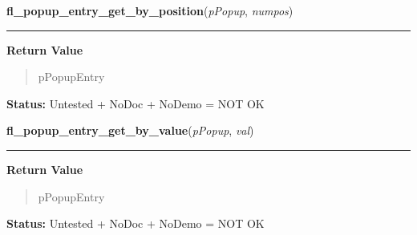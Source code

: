     \label{xformslib:flpopup:fl_popup_entry_get_by_position}

    \vspace{0.5ex}

\hspace{.8\funcindent}\begin{boxedminipage}{\funcwidth}

    \raggedright \textbf{fl\_popup\_entry\_get\_by\_position}(\textit{pPopup}, \textit{numpos})

    \vspace{-1.5ex}

    \rule{\textwidth}{0.5\fboxrule}
\setlength{\parskip}{2ex}
\setlength{\parskip}{1ex}
      \textbf{Return Value}
    \vspace{-1ex}

      \begin{quote}
      pPopupEntry

      \end{quote}

\textbf{Status:} Untested + NoDoc + NoDemo = NOT OK



    \end{boxedminipage}

    \label{xformslib:flpopup:fl_popup_entry_get_by_value}

    \vspace{0.5ex}

\hspace{.8\funcindent}\begin{boxedminipage}{\funcwidth}

    \raggedright \textbf{fl\_popup\_entry\_get\_by\_value}(\textit{pPopup}, \textit{val})

    \vspace{-1.5ex}

    \rule{\textwidth}{0.5\fboxrule}
\setlength{\parskip}{2ex}
\setlength{\parskip}{1ex}
      \textbf{Return Value}
    \vspace{-1ex}

      \begin{quote}
      pPopupEntry

      \end{quote}

\textbf{Status:} Untested + NoDoc + NoDemo = NOT OK



    \end{boxedminipage}

